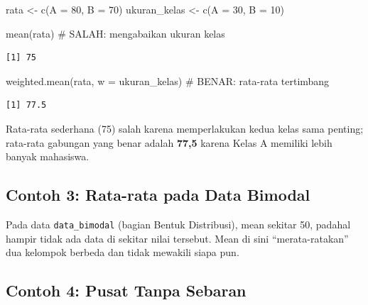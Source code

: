 \documentclass[
  indonesian,
  letterpaper,
]{book}
\newenvironment{Shaded}{\begin{snugshade}}{\end{snugshade}}
\newcommand{\AttributeTok}[1]{\textcolor[rgb]{0.40,0.45,0.13}{#1}}
\newcommand{\CommentTok}[1]{\textcolor[rgb]{0.37,0.37,0.37}{#1}}
\newcommand{\DecValTok}[1]{\textcolor[rgb]{0.68,0.00,0.00}{#1}}
\newcommand{\FunctionTok}[1]{\textcolor[rgb]{0.28,0.35,0.67}{#1}}
\newcommand{\NormalTok}[1]{\textcolor[rgb]{0.00,0.23,0.31}{#1}}
\newcommand{\OtherTok}[1]{\textcolor[rgb]{0.00,0.23,0.31}{#1}}
\begin{document}
\begin{Shaded}
\begin{Highlighting}[]
\NormalTok{rata }\OtherTok{\textless{}{-}} \FunctionTok{c}\NormalTok{(}\AttributeTok{A =} \DecValTok{80}\NormalTok{, }\AttributeTok{B =} \DecValTok{70}\NormalTok{)}
\NormalTok{ukuran\_kelas }\OtherTok{\textless{}{-}} \FunctionTok{c}\NormalTok{(}\AttributeTok{A =} \DecValTok{30}\NormalTok{, }\AttributeTok{B =} \DecValTok{10}\NormalTok{)}

\FunctionTok{mean}\NormalTok{(rata)                              }\CommentTok{\# SALAH: mengabaikan ukuran kelas}
\end{Highlighting}
\end{Shaded}

\begin{verbatim}
[1] 75
\end{verbatim}

\begin{Shaded}
\begin{Highlighting}[]
\FunctionTok{weighted.mean}\NormalTok{(rata, }\AttributeTok{w =}\NormalTok{ ukuran\_kelas)   }\CommentTok{\# BENAR: rata{-}rata tertimbang}
\end{Highlighting}
\end{Shaded}

\begin{verbatim}
[1] 77.5
\end{verbatim}

Rata-rata sederhana (75) salah karena memperlakukan kedua kelas sama
penting; rata-rata gabungan yang benar adalah \textbf{77,5} karena Kelas
A memiliki lebih banyak mahasiswa.

\subsection{Contoh 3: Rata-rata pada Data
Bimodal}\label{contoh-3-rata-rata-pada-data-bimodal}

Pada data \texttt{data\_bimodal} (bagian Bentuk Distribusi), mean
sekitar 50, padahal hampir tidak ada data di sekitar nilai tersebut.
Mean di sini ``merata-ratakan'' dua kelompok berbeda dan tidak mewakili
siapa pun.

\subsection{Contoh 4: Pusat Tanpa
Sebaran}\label{contoh-4-pusat-tanpa-sebaran}
\end{document}
